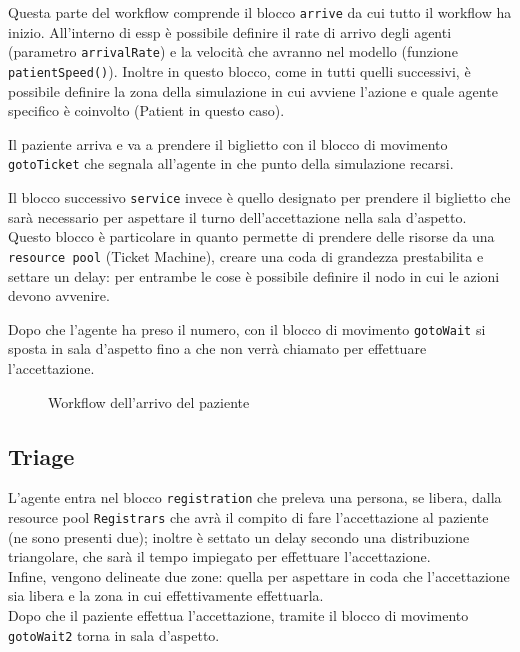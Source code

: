 Questa parte del workflow comprende il blocco \texttt{arrive} da cui tutto il workflow ha inizio. All'interno di essp è possibile definire il rate di arrivo degli agenti (parametro \texttt{arrivalRate}) e la velocità che avranno nel modello (funzione \texttt{patientSpeed()}). 
Inoltre in questo blocco,  come in tutti quelli successivi, è possibile definire la zona della simulazione in cui avviene l’azione e quale agente specifico è coinvolto (Patient in questo caso). 

Il paziente arriva e va a prendere il biglietto con il blocco di movimento \texttt{gotoTicket} che segnala all’agente in che punto della simulazione recarsi.

Il blocco successivo \texttt{service} invece è quello designato per prendere il biglietto che sarà necessario per aspettare il turno dell’accettazione nella sala d’aspetto.\\ Questo blocco è particolare in quanto permette di prendere delle risorse da una \texttt{resource pool} (Ticket Machine), creare una coda di grandezza prestabilita e settare un delay: per entrambe le cose è possibile definire il nodo in cui le azioni devono avvenire. 

Dopo che l’agente ha preso il numero, con il blocco di movimento \texttt{gotoWait} si sposta in sala d’aspetto fino a che non verrà chiamato per effettuare l'accettazione.

\begin{figure}[!htb]
    \centering
    \caption{Workflow dell'arrivo del paziente}
\end{figure}

\clearpage
\subsection{Triage}
L’agente entra nel blocco \texttt{registration} che preleva una persona, se libera, dalla resource pool \texttt{Registrars} che avrà il compito di fare l’accettazione al paziente (ne sono presenti due); inoltre è settato un delay secondo una distribuzione triangolare, che sarà il tempo impiegato per effettuare l’accettazione. \\ Infine, vengono delineate due zone: quella per aspettare in coda che l’accettazione sia libera e la zona in cui effettivamente effettuarla.\\ Dopo che il paziente effettua l’accettazione, tramite il blocco di movimento \texttt{gotoWait2} torna in sala d’aspetto.

